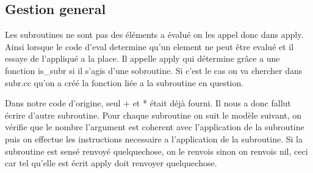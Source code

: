 \documentclass[a4paper]{article}
\begin{document}
\subsection{Gestion general}
	Les subroutines ne sont pas des éléments a évalué on les appel donc dans apply. Ainsi lorsque le code d'eval determine qu'un element ne peut être evalué et il essaye de l'appliqué a la place. Il appelle apply qui détermine grâce a une fonction is\_subr si il s'agis d'une sobroutine. Si c'est le cas on va chercher dans subr.cc qu'on a créé la fonction liée a la subroutine en question.

	Dans notre code d'origine, seul + et * était déjà fourni. Il nous a donc fallut écrire d'autre subroutine. Pour chaque subroutine on suit le modèle suivant, on vérifie que le nombre l'argument est coherent avec l'application de la subroutine puis on effectue les instructions necessaire a l'application de la subroutine. Si la subroutine est sensé renvoyé quelquechose, on le renvois sinon on renvois nil, ceci car tel qu'elle est écrit apply doit renvoyer quelquechose.
\end{document}
